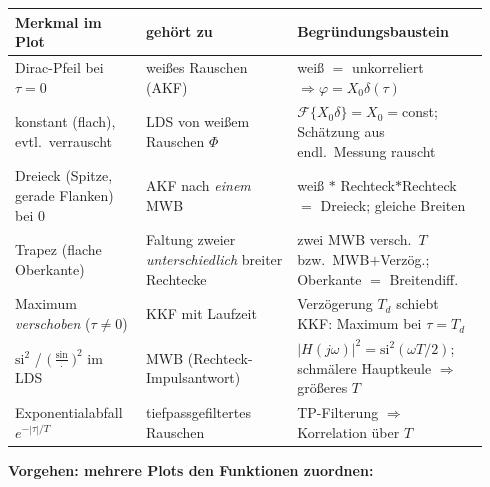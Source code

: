 \noindent\scriptsize\setlength{\tabcolsep}{4pt}%
\renewcommand{\arraystretch}{1.2}%
\begin{tabular}{@{}p{0.26\linewidth}|p{0.30\linewidth}|p{0.38\linewidth}@{}}
  \textbf{Merkmal im Plot} & \textbf{gehört zu} & \textbf{Begründungsbaustein} \\\hline
  Dirac-Pfeil bei $\tau{=}0$ & weißes Rauschen (AKF) &
    weiß $=$ unkorreliert $\Rightarrow \varphi=X_0\delta(\tau)$ \\
  konstant (flach), evtl.\ verrauscht & LDS von weißem Rauschen $\Phi$ &
    $\mathcal F\{X_0\delta\}=X_0=$const; Schätzung aus endl.\ Messung rauscht \\
  Dreieck (Spitze, gerade Flanken) bei $0$ & AKF nach \emph{einem} MWB &
    weiß ${*}$ Rechteck${*}$Rechteck $=$ Dreieck; gleiche Breiten \\
  Trapez (flache Oberkante) & Faltung zweier \emph{unterschiedlich} breiter Rechtecke &
    zwei MWB versch.\ $T$ bzw.\ MWB${+}$Verzög.; Oberkante $=$ Breitendiff. \\
  Maximum \emph{verschoben} ($\tau{\neq}0$) & KKF mit Laufzeit &
    Verzögerung $T_d$ schiebt KKF: Maximum bei $\tau{=}T_d$ \\
  $\mathrm{si}^2$ / $\big(\tfrac{\sin}{\cdot}\big)^2$ im LDS & MWB
    (Rechteck-Impulsantwort) & $|H(j\omega)|^2=\mathrm{si}^2(\omega T/2)$;
    schmälere Hauptkeule $\Rightarrow$ größeres $T$ \\
  Exponentialabfall $e^{-|\tau|/T}$ & tiefpassgefiltertes Rauschen &
    TP-Filterung $\Rightarrow$ Korrelation über $T$ \\
\end{tabular}\par
\vspace{0.15em}
\noindent\footnotesize\textbf{Vorgehen: mehrere Plots den Funktionen zuordnen:}
\begin{rezept}
\end{rezept}
\bereichende

